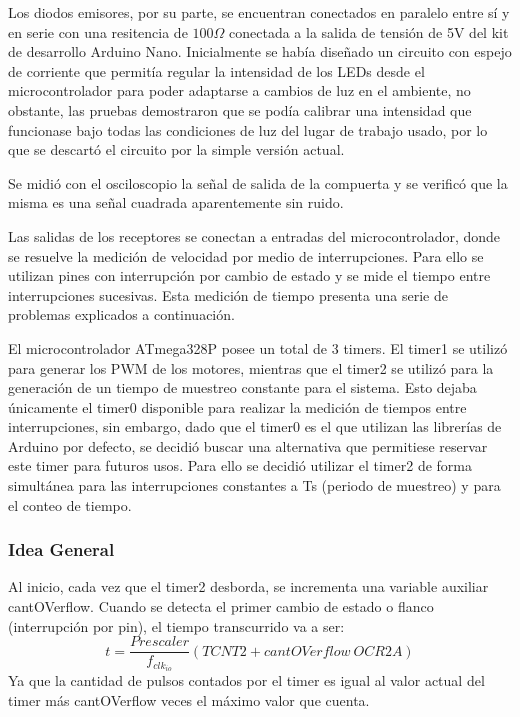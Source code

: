 \documentclass[10pt,conference,a4paper,onecolumn]{article}%
\begin{document}
Los diodos emisores, por su parte, se encuentran conectados en paralelo entre sí y en serie con una resitencia de $100 \Omega$ conectada a la salida de tensión de 5V del kit de desarrollo Arduino Nano. Inicialmente se había diseñado un circuito con espejo de corriente que permitía regular la intensidad de los LEDs desde el microcontrolador para poder adaptarse a cambios de luz en el ambiente, no obstante, las pruebas demostraron que se podía calibrar una intensidad que funcionase bajo todas las condiciones de luz del lugar de trabajo usado, por lo que se descartó el circuito por la simple versión actual.

Se midió con el osciloscopio la señal de salida de la compuerta y se verificó que la misma es una señal cuadrada aparentemente sin ruido.

Las salidas de los receptores se conectan a entradas del microcontrolador, donde se resuelve la medición de velocidad por medio de interrupciones. Para ello se utilizan pines con interrupción  por cambio de estado y se mide el tiempo entre interrupciones sucesivas. Esta medición de tiempo presenta una serie de problemas explicados a continuación.

El microcontrolador ATmega328P posee un total de 3 timers. El timer1 se utilizó para generar los PWM de los motores, mientras que el timer2 se utilizó para la generación de un tiempo de muestreo constante para el sistema. Esto dejaba únicamente el timer0 disponible para realizar la medición de tiempos entre interrupciones, sin embargo, dado que el timer0 es el que utilizan las librerías de Arduino por defecto, se decidió buscar una alternativa que permitiese reservar este timer para futuros usos. Para ello se decidió utilizar el timer2 de forma simultánea para las interrupciones constantes a Ts (periodo de muestreo) y para el conteo de tiempo.

\subsubsection{Idea General}
Al inicio, cada vez que el timer2 desborda, se incrementa una variable auxiliar cantOVerflow. Cuando se detecta el primer cambio de estado o flanco (interrupción por pin), el tiempo transcurrido va a ser:
 \begin{equation*}
 t=\frac{Prescaler}{f_{clk_{io}}} (TCNT2+cantOVerflow\ OCR2A)
 \end{equation*}
Ya que la cantidad de pulsos contados por el timer es igual al valor actual del timer más cantOVerflow veces el máximo valor que cuenta.
\end{document}
